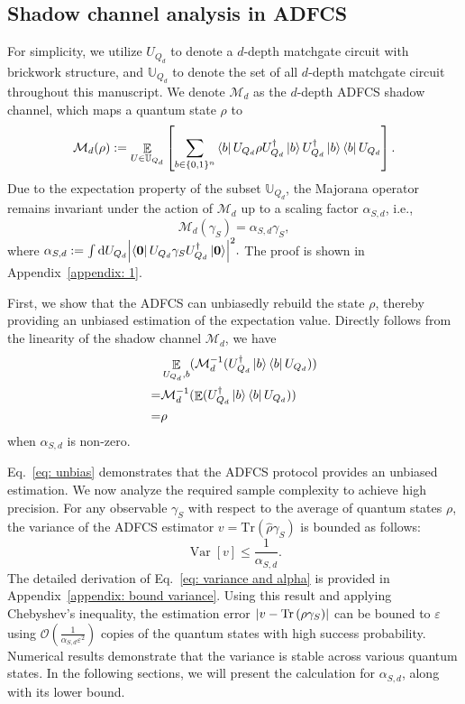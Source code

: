 \documentclass[journal=jctcce,a4paper,manuscript=article]{achemso}
\newcommand{\cbra}[1]{\{ #1 \}}
\newcommand{\tra}[1]{\text{Tr}\left( #1 \right)}
\newcommand{\mean}{\mathop{\mathbb{E}}}
\newcommand{\Var}{\mathop{\mathrm{Var}}}
\newcommand{\Mcal}{\mathcal{M}}
\newcommand{\Ubb}{\mathbb{U}}
\begin{document}
\subsection{Shadow channel analysis in ADFCS}
\label{sec: shadow channel}
For simplicity, we utilize $U_{Q_d}$ to denote a $d$-depth matchgate circuit with brickwork structure, and $\Ubb_{Q_d}$ to denote the set of all $d$-depth matchgate circuit throughout this manuscript. We denote $\Mcal_d$ as the $d$-depth ADFCS shadow channel, which maps a quantum state $\rho$ to
\begin{equation}
  \mathcal{M}_d(\rho) := \mathop{\mathbb{E}}\limits_{U\in\Ubb_{Q_d}} \left[\sum_{b\in\cbra{0,1}^n} \bra{b}U_{Q_d}
  \rho U_{Q_d}^\dagger \ket{b}  U_{Q_d}^\dagger \ket{b} \bra{b}U_{Q_d}\right].
\end{equation}
Due to the expectation property of the subset $\Ubb_{Q_d}$, the Majorana operator remains invariant under the action of $\Mcal_{d}$ up to a scaling factor $\alpha_{S,d}$, i.e.,
\begin{equation}
  \mathcal{M}_d(\gamma_S) = \alpha_{S,d} \gamma_S,
  \label{eq: lemma1 eigen}
\end{equation}
where
$\alpha_{S,d} := \int \dd U_{Q_d} \abs{\bra{\bm 0}U_{Q_d} \gamma_S U_{Q_d}^\dagger\ket{\bm 0}}^2.$
The proof is shown in Appendix~\ref{appendix: 1}.

First, we show that the ADFCS can unbiasedly rebuild the state $\rho$, thereby
providing an unbiased estimation of the expectation value. Directly follows
from the linearity of the shadow channel $\mathcal{M}_d$, we have
\begin{align}
    & \mathop{\mathbb{E}}\limits_{U_{Q_d}, b } ( \mathcal{M}^{-1}_{d}(U_{Q_d}^\dagger \ket{b} \bra{b}U_{Q_d})) \\
  = & \mathcal{M}^{-1}_{d}(\mean(U_{Q_d}^\dagger \ket{b} \bra{b}U_{Q_d}) )                                     \\
  = & \rho
  \label{eq: unbias}
\end{align}
when $\alpha_{S,d}$ is non-zero.

Eq.~\eqref{eq: unbias} demonstrates that the ADFCS protocol provides an
unbiased estimation. We now analyze the required sample complexity to achieve
high precision. For any observable $\gamma_S$ with respect to the average of
quantum states $\rho$, the variance of the ADFCS estimator $v = \tra{\hat{\rho}
    \gamma_S}$ is bounded as follows:
\begin{equation}
  \Var[v] \leq \frac{1}{\alpha_{S,d}}.
  \label{eq: variance and alpha}
\end{equation}
The detailed derivation of Eq.~\eqref{eq: variance and alpha} is provided in Appendix~\ref{appendix: bound variance}. Using this result and applying Chebyshev's inequality, the estimation error $\abs{v - \tra{\rho \gamma_S}}$ can be bouned to $\varepsilon$ using $\mathcal{O}(\frac{1}{\alpha_{S,d}\varepsilon^2})$ copies of the quantum states with high success probability. Numerical results demonstrate that the variance is stable across various quantum states. In the following sections, we will present the calculation for $\alpha_{S,d}$, along with its {lower bound.}
\end{document}
